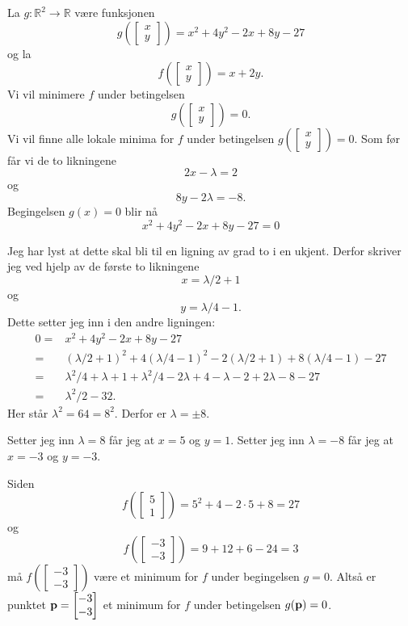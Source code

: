 \begin{eksempel}
  La $g\colon \mathbb{R}^2 \to \mathbb{R}$ være funksjonen
  $$g(\begin{bmatrix}x\\y\end{bmatrix}) = x^2 + 4y^2 -2x + 8y -27$$
  og la 
  $$f(\begin{bmatrix}x\\y\end{bmatrix}) = x + 2y.$$
  Vi vil minimere $f$ under betingelsen 
  $$g(\begin{bmatrix}x\\y\end{bmatrix}) = 0.$$
  Vi vil
  finne alle lokale minima for $f$ under betingelsen
  $g(\begin{bmatrix}x\\y\end{bmatrix}) = 0$.
  Som før får vi de to likningene
  $$
  2x - \lambda = 2$$
  og 
  $$
  8y - 2\lambda = -8.$$
  Begingelsen $g(x) = 0$ blir nå
  $$x^2 + 4y^2 -2x + 8y -27 = 0$$

  Jeg har lyst at dette skal bli til en ligning av grad to i en ukjent. Derfor skriver jeg
  ved hjelp av de første to likningene
  $$ x = \lambda/2 + 1$$
  og
  $$ y = \lambda/4 - 1.$$
  Dette setter jeg inn i den andre ligningen:
  \begin{align*}
    0 =
    &x^2 + 4y^2 -2x + 8y -27 \\
    =&
    (\lambda/2 + 1)^2 + 4(\lambda/4 - 1)^2 -2(\lambda/2 + 1) + 8(\lambda/4 - 1) -27\\
    =&
    \lambda^2/4 + \lambda + 1 + \lambda^2/4 - 2\lambda + 4 -\lambda - 2 + 2\lambda - 8 -27\\
    =&
    \lambda^2/2 - 32.
  \end{align*}
  Her står $\lambda^2 = 64 = 8^2$. Derfor er $\lambda = \pm 8$.
  
  Setter jeg inn $\lambda = 8$ får jeg at $x = 5$ og $y = 1$. Setter jeg inn
  $\lambda = -8$ får jeg at $x = -3$ og $y = -3$.

  Siden 
  $$f(\begin{bmatrix}5\\1\end{bmatrix}) = 5^2 + 4 - 2\cdot 5 + 8 = 27$$
  og
  $$f(\begin{bmatrix}-3\\-3\end{bmatrix}) = 9 + 12 + 6 - 24 = 3$$
  må $f(\begin{bmatrix}-3\\-3\end{bmatrix})$ være et minimum for $f$ under
  begingelsen $g = 0$. Altså er punktet 
  $\mathbf{p} = \begin{bmatrix}-3\\-3\end{bmatrix}$ et minimum for $f$ under betingelsen
  $g(\mathbf{p}) = 0$.

\end{eksempel}

